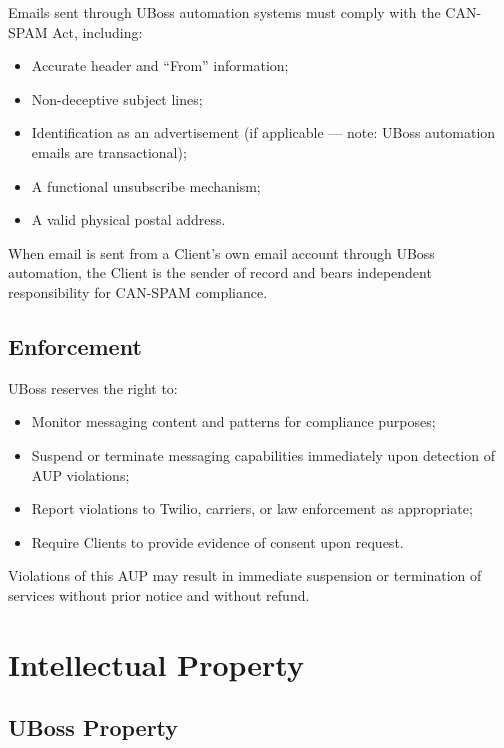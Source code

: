\documentclass[11pt,letterpaper,parskip=half]{scrartcl}
\begin{document}
Emails sent through UBoss automation systems must comply with the CAN-SPAM Act, including:

\begin{itemize}[nosep, leftmargin=1.5em]
    \item Accurate header and ``From'' information;
    \item Non-deceptive subject lines;
    \item Identification as an advertisement (if applicable --- note: UBoss automation emails are transactional);
    \item A functional unsubscribe mechanism;
    \item A valid physical postal address.
\end{itemize}

When email is sent from a Client's own email account through UBoss automation, the Client is the sender of record and bears independent responsibility for CAN-SPAM compliance.

\subsection{Enforcement}

UBoss reserves the right to:

\begin{itemize}[nosep, leftmargin=1.5em]
    \item Monitor messaging content and patterns for compliance purposes;
    \item Suspend or terminate messaging capabilities immediately upon detection of AUP violations;
    \item Report violations to Twilio, carriers, or law enforcement as appropriate;
    \item Require Clients to provide evidence of consent upon request.
\end{itemize}

Violations of this AUP may result in immediate suspension or termination of services without prior notice and without refund.

\section{Intellectual Property}

\subsection{UBoss Property}
\end{document}
